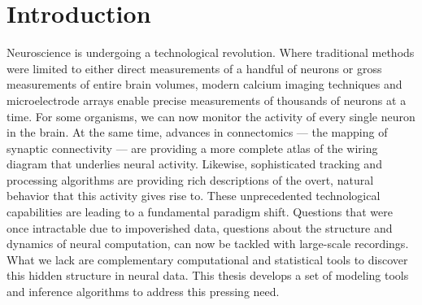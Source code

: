 \chapter{Introduction}
\label{introduction}


Neuroscience is undergoing a technological revolution. Where
traditional methods were limited to either direct measurements of a
handful of neurons or gross measurements of
entire brain volumes, modern calcium imaging techniques and
microelectrode arrays enable precise measurements of thousands of
neurons at a time. For some organisms, we can now monitor the activity
of every single neuron in the brain.
At the same time, advances in connectomics --- the
mapping of synaptic connectivity --- are providing a
more complete atlas of the wiring diagram that underlies neural
activity.  Likewise, sophisticated tracking and processing algorithms
are providing rich descriptions of the overt, natural behavior that
this activity gives rise to.  These unprecedented technological
capabilities are leading to a fundamental paradigm shift.
Questions that were once intractable due to impoverished data,
questions about the structure and dynamics of neural computation,
can now be tackled with large-scale recordings.
What we lack are complementary computational and statistical tools to
discover this hidden structure in neural data.  This thesis develops a
set of modeling tools and inference algorithms to address this
pressing need.

